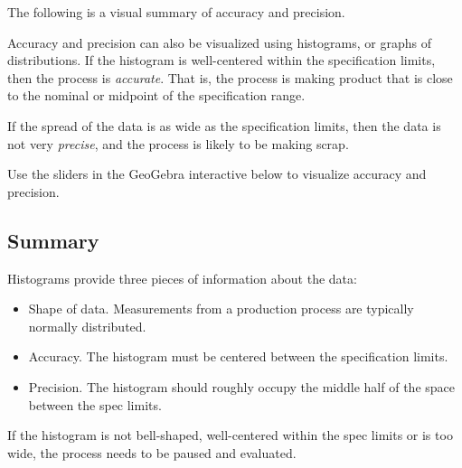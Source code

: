 \documentclass{ximera}
\begin{document}
The following is a visual summary of accuracy and precision.

\begin{center}
      \end{center}

Accuracy and precision can also be visualized using histograms, or graphs of distributions.  If the histogram is well-centered within the specification limits, then the process is \emph{accurate}. That is, the process is making product that is close to the nominal or midpoint of the specification range.

If the spread of the data is as wide as the specification limits, then the data is not very \emph{precise}, and the process is likely to be making scrap.

Use the sliders in the GeoGebra interactive below to visualize accuracy and precision.
\begin{onlineOnly}
\begin{center} 
\end{center}
\end{onlineOnly}

\subsection*{Summary}
Histograms provide three pieces of information about the data:
\begin{itemize}
    \item Shape of data.  Measurements from a production process are typically normally distributed.  
    \item Accuracy.  The histogram must be centered between the specification limits.  
    \item Precision.  The histogram should roughly occupy the middle half of the space between the spec limits. 
\end{itemize}
If the histogram is not bell-shaped, well-centered within the spec limits or is too wide, the process needs to be paused and evaluated.
\end{document}
